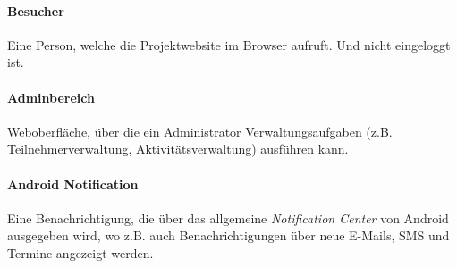 \documentclass[10pt,a4paper]{article}
\begin{document}
\paragraph{Besucher} Eine Person, welche die Projektwebsite im Browser aufruft. Und nicht eingeloggt ist.

\paragraph{Adminbereich} Weboberfläche, über die ein Administrator Verwaltungsaufgaben (z.B. Teilnehmerverwaltung, Aktivitätsverwaltung) ausführen kann.

\paragraph{Android Notification} Eine Benachrichtigung, die über das allgemeine \emph{Notification Center} von Android ausgegeben wird, wo z.B. auch Benachrichtigungen über neue E-Mails, SMS und Termine angezeigt werden.
\end{document}
